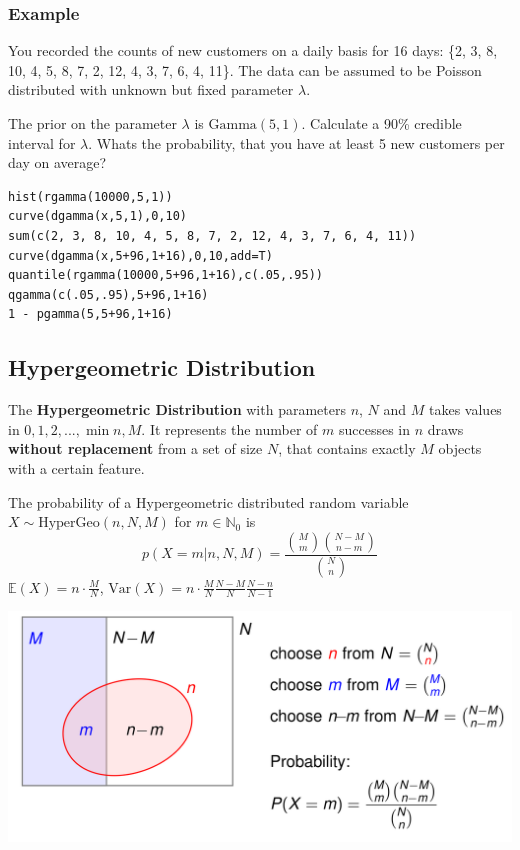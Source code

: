 \documentclass[11pt]{article}
\begin{document}
\subsubsection{Example}
You recorded the counts of new customers on a daily basis for 16 days: \{2, 3, 8, 10, 4, 5, 8, 7, 2, 12, 4, 3, 7, 6, 4, 11\}.
The data can be assumed to be Poisson distributed with unknown but fixed parameter $\lambda$. 

The prior on the parameter $\lambda$ is $\text{Gamma}(5,1)$. Calculate a 90\% credible interval for $\lambda$. Whats the probability, that you have at least 5 new customers per day on average?

\begin{verbatim}
hist(rgamma(10000,5,1))
curve(dgamma(x,5,1),0,10)
sum(c(2, 3, 8, 10, 4, 5, 8, 7, 2, 12, 4, 3, 7, 6, 4, 11))
curve(dgamma(x,5+96,1+16),0,10,add=T)
quantile(rgamma(10000,5+96,1+16),c(.05,.95))
qgamma(c(.05,.95),5+96,1+16)
1 - pgamma(5,5+96,1+16)
\end{verbatim}

\subsection{Hypergeometric Distribution}
The \textbf{Hypergeometric Distribution} with parameters $n$, $N$ and $M$ takes values in $0,1,2,...,\min{n,M}$. It represents the number of $m$ successes in $n$ draws \textbf{without replacement} from a set of size $N$, that contains exactly $M$ objects with a certain feature.

The probability of a Hypergeometric distributed random variable $X \sim \text{HyperGeo}(n,N,M)$ for $m \in \mathbb{N}_0$ is
\begin{equation*}
	p(X=m|n,N,M) = \frac{\binom{M}{m}\binom{N-M}{n-m}}{\binom{N}{n}}
\end{equation*}
\noindent
$\mathbb{E}(X)=n\cdot\frac{M}{N}$, $\text{Var}(X) = n\cdot\frac{M}{N}\frac{N-M}{N}\frac{N-n}{N-1}$

\begin{center}
	\includegraphics[width=0.7\linewidth]{img/hypergeometric_ditribution_derivation}
\end{center}
\end{document}

